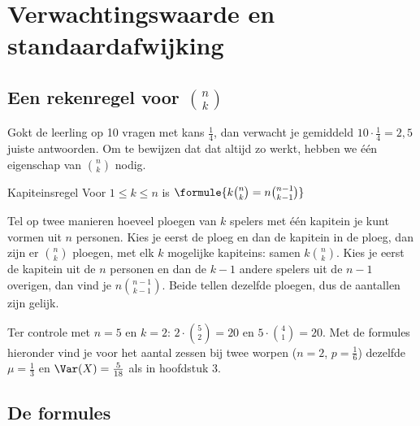 \begin{oefeningen}

\end{oefeningen}

\section{Verwachtingswaarde en standaardafwijking}

\subsection{Een rekenregel voor $\binom{n}{k}$}

Gokt de leerling op 10 vragen met kans $\frac14$, dan verwacht je gemiddeld $10 \cdot \frac14 = 2{,}5$ juiste antwoorden. Om te bewijzen dat dat altijd zo werkt, hebben we één eigenschap van $\binom{n}{k}$ nodig.

\begin{theorie}
\begin{stelling}{Kapiteinsregel}
Voor $1 \leqslant k \leqslant n$ is \quad $\formule{k \binom{n}{k} = n \binom{n - 1}{k - 1}}$
\end{stelling}

\begin{bewijs}
Tel op twee manieren hoeveel ploegen van $k$ spelers met één kapitein je kunt vormen uit $n$ personen. Kies je eerst de ploeg en dan de kapitein in de ploeg, dan zijn er $\binom{n}{k}$ ploegen, met elk $k$ mogelijke kapiteins: samen $k\binom{n}{k}$. Kies je eerst de kapitein uit de $n$ personen en dan de $k - 1$ andere spelers uit de $n - 1$ overigen, dan vind je $n \binom{n - 1}{k - 1}$. Beide tellen dezelfde ploegen, dus de aantallen zijn gelijk.
\end{bewijs}
\end{theorie}

Ter controle met $n = 5$ en $k = 2$: $2 \cdot \binom52 = 20$ en $5 \cdot \binom41 = 20$. Met de formules hieronder vind je voor het aantal zessen bij twee worpen ($n = 2$, $p = \frac16$) dezelfde $\mu = \frac13$ en $\Var(X) = \frac{5}{18}$ als in hoofdstuk 3.

\subsection{De formules}

